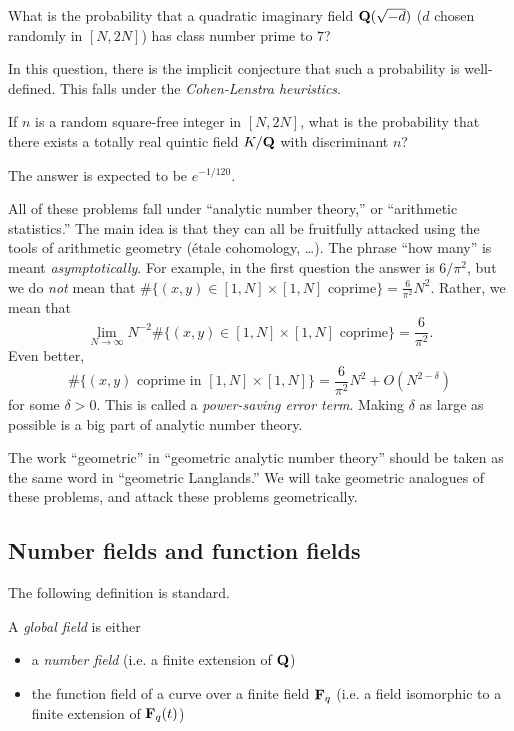 \begin{question}
What is the probability that a quadratic imaginary field $\mathbf{Q}(\sqrt{-d})$ 
($d$ chosen randomly in $[N,2 N]$) has class number prime to $7$? 
\end{question}

In this question, there is the implicit conjecture that such a probability is 
well-defined. This falls under the \emph{Cohen-Lenstra heuristics}. 

\begin{question}
If $n$ is a random square-free integer in $[N, 2 N]$, what is the probability 
that there exists a totally real quintic field $K/\mathbf{Q}$ with discriminant $n$? 
\end{question}

The answer is expected to be $e^{-1/120}$. 

All of these problems fall under ``analytic number theory,'' or ``arithmetic 
statistics.'' The main idea is that they can all be fruitfully attacked using 
the tools of arithmetic geometry (\'etale cohomology, \ldots). The phrase 
``how many'' is meant \emph{asymptotically}. For example, in the first 
question the answer is $6/\pi^2$, but we do \emph{not} mean that 
$\#\{(x,y)\in [1,N]\times [1,N]\text{ coprime}\} = \frac{6}{\pi^2} N^2$. 
Rather, we mean that 
\[
  \lim_{N\to \infty} N^{-2} \# \{(x,y)\in [1,N]\times [1,N]\text{ coprime}\} = \frac{6}{\pi^2} .
\]
Even better, 
\[
  \# \{(x,y)\text{ coprime in }[1,N]\times [1,N]\} = \frac{6}{\pi^2} N^2 + O(N^{2-\delta}) 
\]
for some $\delta>0$. This is called a \emph{power-saving error term}. Making 
$\delta$ as large as possible is a big part of analytic number theory. 

The work ``geometric'' in ``geometric analytic number theory'' should be taken 
as the same word in ``geometric Langlands.'' We will take geometric analogues 
of these problems, and attack these problems geometrically. 





\subsection{Number fields and function fields}

The following definition is standard. 

\begin{definition}
A \emph{global field} is either 
\begin{itemize}
  \item a \emph{number field} (i.e. a finite extension of $\mathbf{Q}$) 
  \item the function field of a curve over a finite field $\mathbf{F}_q$ (i.e. a field 
    isomorphic to a finite extension of $\mathbf{F}_q(t)$)
\end{itemize}
\end{definition}

